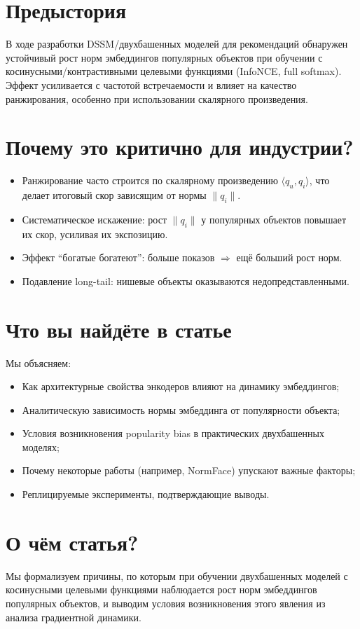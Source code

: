 \section{Предыстория}
В ходе разработки DSSM/двухбашенных моделей для рекомендаций обнаружен устойчивый рост норм эмбеддингов популярных объектов при обучении с косинусными/контрастивными целевыми функциями (InfoNCE, full softmax). Эффект усиливается с частотой встречаемости и влияет на качество ранжирования, особенно при использовании скалярного произведения.

\section{Почему это критично для индустрии?}
\begin{itemize}
  \item Ранжирование часто строится по скалярному произведению \(\langle q_u, q_i\rangle\), что делает итоговый скор зависящим от нормы \(\|q_i\|\).
  \item Систематическое искажение: рост \(\|q_i\|\) у популярных объектов повышает их скор, усиливая их экспозицию.
  \item Эффект ``богатые богатеют'': больше показов \(\Rightarrow\) ещё больший рост норм.
  \item Подавление long-tail: нишевые объекты оказываются недопредставленными.
\end{itemize}

\section{Что вы найдёте в статье}
Мы объясняем:
\begin{itemize}
  \item Как архитектурные свойства энкодеров влияют на динамику эмбеддингов;
  \item Аналитическую зависимость нормы эмбеддинга от популярности объекта;
  \item Условия возникновения popularity bias в практических двухбашенных моделях;
  \item Почему некоторые работы (например, NormFace) упускают важные факторы;
  \item Реплицируемые эксперименты, подтверждающие выводы.
\end{itemize}

\section{О чём статья?}
Мы формализуем причины, по которым при обучении двухбашенных моделей с косинусными целевыми функциями наблюдается рост норм эмбеддингов популярных объектов, и выводим условия возникновения этого явления из анализа градиентной динамики.
